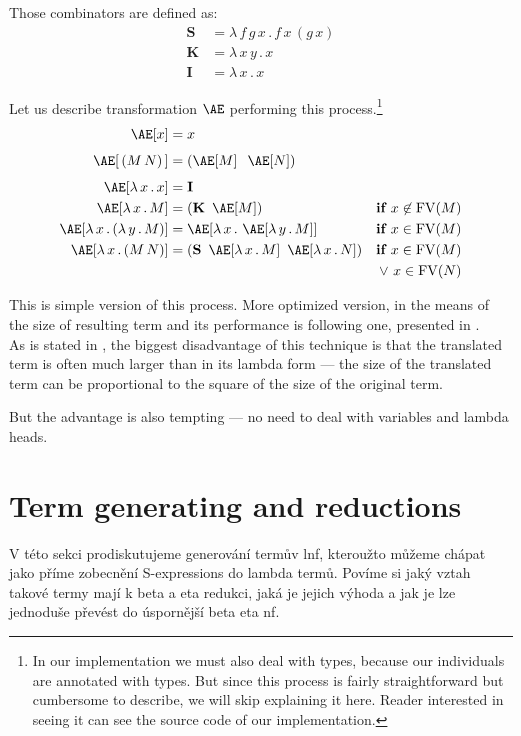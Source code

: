 \documentclass{sig-alternate}
\newcommand{\Lets}{Let us\xspace}
\newcommand{\lamb}[2]{( \lambda \, #1 \, . \, #2 )}
\newcommand{\lam}[2]{\lambda \, #1 \, . \, #2}
\newcommand{\FV}{\mathop{\mathrm{FV}}}
\newcommand{\Scomb }{\mathbf{S}}
\newcommand{\Kcomb }{\mathbf{K}}
\newcommand{\Icomb }{\mathbf{I}}
\newcommand{\Ae}{\mathop{\mathrm{\AE}}}
\newcommand{\red}[1]{{\color{red} #1}}
\begin{document}
Those combinators are defined as:
\begin{align*}
\Scomb &= \lam{f\,g\,x}{f\,x\,(g\,x)} \\
\Kcomb &= \lam{x\,y}{x} \\
\Icomb &= \lam{x}{x} 
\end{align*}


\Lets describe transformation $\Ae$ performing this 
process.\footnote{In our implementation we must also deal with types, because 
our individuals are annotated with types. But since this process
is fairly straightforward but cumbersome to describe, we will 
skip explaining it here. Reader interested in seeing it can see 
the source code of our implementation. }
\begin{align*}
\Ae[x]           &= x &\\[0.4em]
\Ae[\,(M\,N)\,]  &= (\Ae[M]\;\;\Ae[N]) &\\[0.4em]
\Ae[\lam{x}{x}]  &= \Icomb &\\
\Ae[\lam{x}{M}]  &= (\Kcomb~\Ae[M]) &\textbf{if } x \not\in \FV(M)\\
\Ae[\lam{x}{\lamb{y}{M}}] &= \Ae[\lam{x}{\Ae[\lam{y}{M}]}]  
&\textbf{if } x \in \FV(M)\\
\Ae[\lam{x}{(M\,N)}] &= (\Scomb~\Ae[\lam{x}{M}]~\Ae[\lam{x}{N}])  
&\textbf{if } x \in \FV(M)\\
&&\vee~ x \in \FV(N)\\
\end{align*}


This is simple version of this process. More optimized version,
in the means of the size of resulting term and its performance
is following one, presented in \cite{jones87}.\\


As is stated in \cite{jones87},
the biggest disadvantage of this technique is that the translated
term is often much larger than in its lambda form --- the size of
the translated term can be proportional to the
square of the size of the original term. 

But the advantage is also tempting --- no need to deal with variables
and lambda heads.


\section{Term generating and reductions}

\red{
V této sekci prodiskutujeme generování termův lnf, kteroužto můžeme chápat jako
příme zobecnění S-expressions do lambda termů. Povíme si jaký vztah takové termy mají
k beta a eta redukci, jaká je jejich výhoda a jak je lze jednoduše převést
do úspornější beta eta nf. 
}
\end{document}
